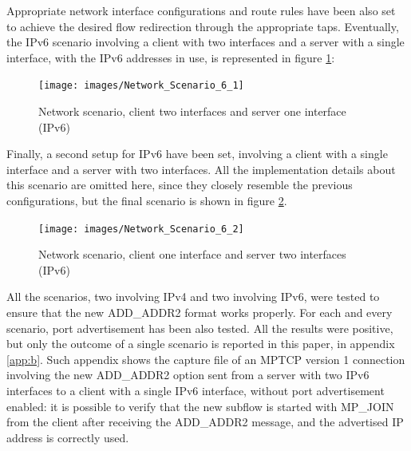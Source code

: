 

%

Appropriate network interface configurations and route rules have been also set to achieve the desired flow redirection through the appropriate taps. Eventually, the IPv6 scenario involving a client with two interfaces and a server with a single interface, with the IPv6 addresses in use, is represented in figure \ref{fig:netip6_1}:

\begin{figure}[!htb]
\centering
\texttt{[image: images/Network\_Scenario\_6\_1]}
\caption{Network scenario, client two interfaces and server one interface (IPv6)}
\label{fig:netip6_1}
\end{figure} 

Finally, a second setup for IPv6 have been set, involving a client with a single interface and a server with two interfaces. All the implementation details about this scenario are omitted here, since they closely resemble the previous configurations, but the final scenario is shown in figure \ref{fig:netip6_2}.

\begin{figure}[!htb]
\centering
\texttt{[image: images/Network\_Scenario\_6\_2]}
\caption{Network scenario, client one interface and server two interfaces (IPv6)}
\label{fig:netip6_2}
\end{figure} 

All the scenarios, two involving IPv4 and two involving IPv6, were tested to ensure that the new ADD\_ADDR2 format works properly. For each and every scenario, port advertisement has been also tested. All the results were positive, but only the outcome of a single scenario is reported in this paper, in appendix \ref{app:b}. Such appendix shows the capture file of an MPTCP version 1 connection involving the new ADD\_ADDR2 option sent from a server with two IPv6 interfaces to a client with a single IPv6 interface, without port advertisement enabled: it is possible to verify that the new subflow is started with MP\_JOIN from the client after receiving the ADD\_ADDR2 message, and the advertised IP address is correctly used.

